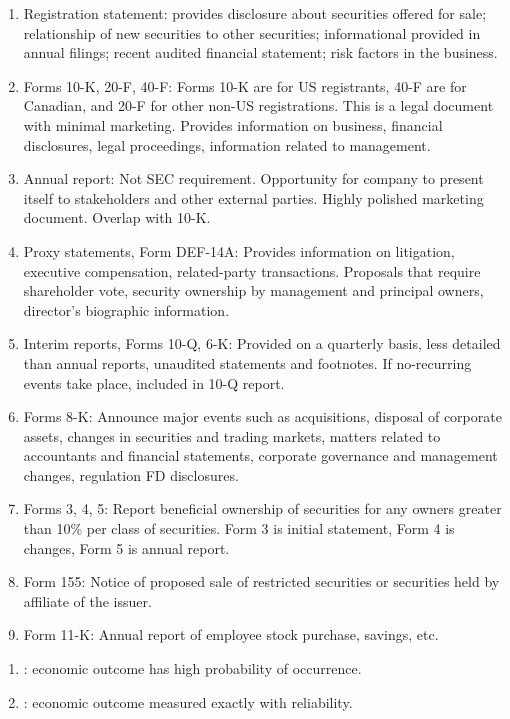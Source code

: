 \begin{remark} 
\begin{enumerate}[label=\roman*.]
\setlength{\itemsep}{0pt}
\item Registration statement: provides disclosure about securities offered for sale; relationship of new securities to other securities; informational provided in annual filings; recent audited financial statement; risk factors in the business.
\item Forms 10-K, 20-F, 40-F: Forms 10-K are for US registrants, 40-F are for Canadian, and 20-F for other non-US registrations. This is a legal document with minimal marketing. Provides information on business, financial disclosures, legal proceedings, information related to management. 
\item Annual report: Not SEC requirement. Opportunity for company to present itself to stakeholders and other external parties. Highly polished marketing document. Overlap with 10-K.
\item Proxy statements, Form DEF-14A: Provides information on litigation, executive compensation, related-party transactions. Proposals that require shareholder vote, security ownership by management and principal owners, director’s biographic information.
\item Interim reports, Forms 10-Q, 6-K: Provided on a quarterly basis, less detailed than annual reports, unaudited statements and footnotes. If no-recurring events take place, included in 10-Q report.
\item Forms 8-K: Announce major events such as acquisitions, disposal of corporate assets, changes in securities and trading markets, matters related to accountants and financial statements, corporate governance and management changes, regulation FD disclosures.
\item Forms 3, 4, 5: Report beneficial ownership of securities for any owners greater than 10\% per class of securities. Form 3 is initial statement, Form 4 is changes, Form 5 is annual report.
\item Form 155: Notice of proposed sale of restricted securities or securities held by affiliate of the issuer.
\item Form 11-K: Annual report of employee stock purchase, savings, etc.
\end{enumerate}
\end{remark}

\begin{definition} 
\begin{enumerate}[label=\roman*.]
\setlength{\itemsep}{0pt}
\item {}: economic outcome has high probability of occurrence.
\item {}: economic outcome measured exactly with reliability.
\end{enumerate}
\end{definition}

